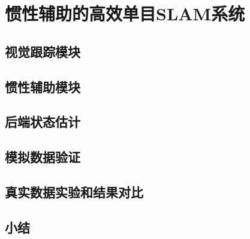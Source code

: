 \chapter{惯性辅助的高效单目SLAM系统}

\section{视觉跟踪模块}

\section{惯性辅助模块}

\section{后端状态估计}

\section{模拟数据验证}

\section{真实数据实验和结果对比}

\section{小结}
